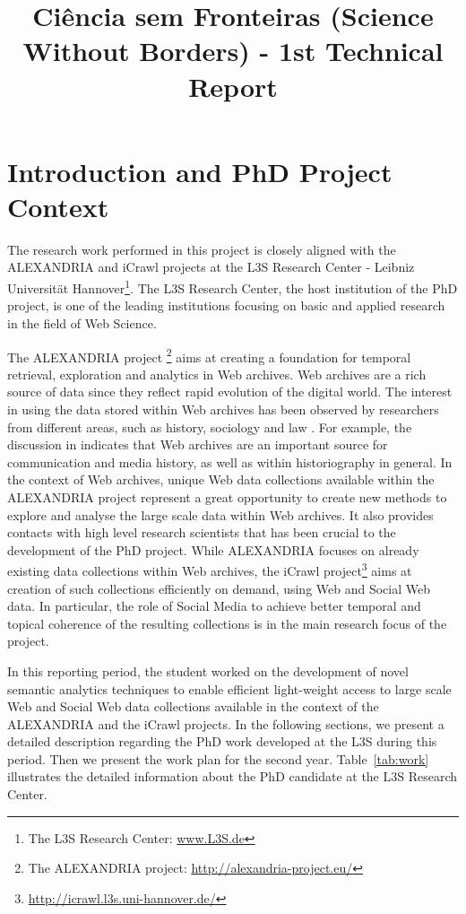 \documentclass[a4paper,11pt]{report}
\title{Ciência sem Fronteiras (Science Without Borders) - 1st Technical Report}
\begin{document}
\maketitle

\chapter{Introduction and PhD Project Context}

The research work performed in this project is closely aligned with the ALEXANDRIA 
and iCrawl projects at the L3S Research Center -  
Leibniz Universit\"at Hannover\footnote{The L3S Research Center: \url{www.L3S.de}}.  
%
The L3S Research Center, the host institution of the PhD project, 
is one of the leading institutions
focusing on basic and applied research in the field of Web Science.  
% 

The ALEXANDRIA project \footnote{The ALEXANDRIA project: \url{http://alexandria-project.eu/}} 
aims at creating a foundation for temporal retrieval, exploration and analytics in Web archives.
%
Web archives are a rich source of data since they reflect rapid evolution
of the digital world. The interest in using the data
stored within Web archives has been observed by researchers from different
areas, such as history, sociology and law \cite{icrawlRequirements}. For example, 
the discussion in \cite{Brugger14} indicates that Web archives are an important source for
communication and media history, as well as within historiography in general.
%
In the context of Web archives, unique Web data collections available within 
the ALEXANDRIA project represent a great opportunity to create new
methods to explore and analyse the large scale data within Web archives.
It also provides contacts with high level
research scientists that has been crucial to the development of the PhD project.
%
While ALEXANDRIA focuses on already existing data collections within Web archives,
the iCrawl project\footnote{\url{http://icrawl.l3s.uni-hannover.de/}} 
aims at creation of such collections efficiently on demand, 
using Web and Social Web data. In particular, the role of Social Media to achieve
better temporal and topical coherence of the resulting collections is in the  
main research focus of the project.

In this reporting period, the student worked on the development of novel semantic analytics techniques 
to enable efficient light-weight access to large scale Web and Social Web data collections 
available in the context of the ALEXANDRIA and the iCrawl projects. 
%
In the following sections, we present a detailed description regarding the PhD work
developed at the L3S during this period. 
Then we present the work plan for the second year. 
%
Table~\ref{tab:work} illustrates the detailed information about the PhD
candidate at the L3S Research Center.
\end{document}
